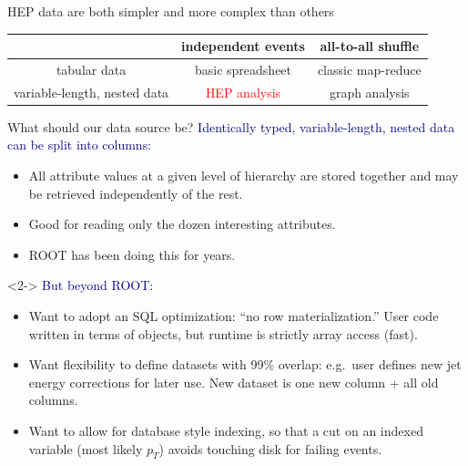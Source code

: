 \documentclass[aspectratio=169]{beamer}
\begin{document}
\begin{frame}{HEP data are both simpler and more complex than others}

\renewcommand{\arraystretch}{2}
\begin{center}
\begin{tabular}{c | c c}
                             & independent events & all-to-all shuffle \\\hline
tabular data                 & basic spreadsheet  & classic map-reduce \\
variable-length, nested data & \textcolor{red}{HEP analysis} & graph analysis \\
\end{tabular}
\end{center}
\end{frame}

\begin{frame}{What should our data source be?}
\vspace{0.5 cm}
\textcolor{darkblue}{Identically typed, variable-length, nested data can be split into columns:}
\begin{itemize}
\item All attribute values at a given level of hierarchy are stored together and may be retrieved independently of the rest.
\item Good for reading only the dozen interesting attributes.
\item ROOT has been doing this for years.
\end{itemize}

\begin{uncoverenv}<2->
\vspace{0.25 cm}
\textcolor{darkblue}{But beyond ROOT:}
\begin{itemize}
\item<2-> Want to adopt an SQL optimization: ``no row materialization.'' User code written in terms of objects, but runtime is strictly array access (fast).
\item<3-> Want flexibility to define datasets with 99\% overlap: e.g.\ user defines new jet energy corrections for later use. New dataset is one new column + all old columns.
\item<4-> Want to allow for database style indexing, so that a cut on an indexed variable (most likely $p_T$) avoids touching disk for failing events.
\end{itemize}
\end{uncoverenv}
\end{frame}
\end{document}
